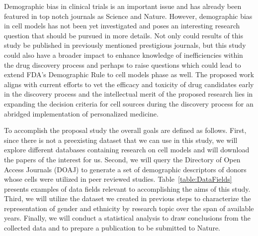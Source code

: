 \documentclass[10pt]{article}
\begin{document}
\newpage 

Demographic bias in clinical trials is an important issue and has already been featured in top notch journals as Science and Nature. However, demographic bias in cell models has not been yet investigated and poses an interesting research question that should be pursued in more details. Not only could results of this study be published in previously mentioned prestigious journals, but this study could also have a broader impact to enhance knowledge of inefficiencies within the drug discovery process and perhaps to raise questions which could lead to extend FDA's Demographic Rule to cell models phase as well. The proposed work aligns with current efforts to vet the efficacy and toxicity of drug candidates early in the discovery process and the intellectual merit of the proposed research lies in expanding the decision criteria for cell sources during the discovery process for an abridged implementation of personalized medicine. 

To accomplish the proposal study the overall goals are defined as follows. First, since there is not a preexisting dataset that we can use in this study, we will explore different databases containing research on cell models and will download the papers of the interest for us. Second, we will query the Directory of Open Access Journals (DOAJ) to generate a set of demographic descriptors of donors whose cells were utilized in peer reviewed studies. Table~\ref{table:DataFields} presents examples of data fields relevant to accomplishing the aims of this study. Third, we will utilize the dataset we created in previous steps to characterize the representation of gender and ethnicity by research topic over the span of available years. Finally, we will conduct a statistical analysis to draw conclusions from the collected data and to prepare a publication to be submitted to Nature.
\end{document}
